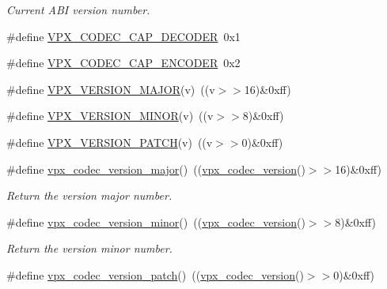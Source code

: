 \begin{DoxyCompactItemize}
\begin{DoxyCompactList}\small\item\em Current A\+BI version number. \end{DoxyCompactList}\item 
\#define \hyperlink{group__codec_gae10ad7f9548170aef77df09d48ad108a}{V\+P\+X\+\_\+\+C\+O\+D\+E\+C\+\_\+\+C\+A\+P\+\_\+\+D\+E\+C\+O\+D\+ER}~0x1
\item 
\#define \hyperlink{group__codec_gab2e8b76fff95ebd573a17bdc11f8a441}{V\+P\+X\+\_\+\+C\+O\+D\+E\+C\+\_\+\+C\+A\+P\+\_\+\+E\+N\+C\+O\+D\+ER}~0x2
\item 
\#define \hyperlink{group__codec_gadebddd67347fe47c0772b1e06b6173ba}{V\+P\+X\+\_\+\+V\+E\+R\+S\+I\+O\+N\+\_\+\+M\+A\+J\+OR}(v)~((v$>$$>$16)\&0xff)
\item 
\#define \hyperlink{group__codec_ga4a5ce4588576306dee0d95e8f8706f86}{V\+P\+X\+\_\+\+V\+E\+R\+S\+I\+O\+N\+\_\+\+M\+I\+N\+OR}(v)~((v$>$$>$8)\&0xff)
\item 
\#define \hyperlink{group__codec_ga4acf2cf4c35ff123d17cd67c069fdbaa}{V\+P\+X\+\_\+\+V\+E\+R\+S\+I\+O\+N\+\_\+\+P\+A\+T\+CH}(v)~((v$>$$>$0)\&0xff)
\item 
\#define \hyperlink{group__codec_gaf314b746e4e202045e85ac073c29a495}{vpx\+\_\+codec\+\_\+version\+\_\+major}()~((\hyperlink{group__codec_ga163037ae037ac760da65e4130c7d4767}{vpx\+\_\+codec\+\_\+version}()$>$$>$16)\&0xff)\hypertarget{group__codec_gaf314b746e4e202045e85ac073c29a495}{}\label{group__codec_gaf314b746e4e202045e85ac073c29a495}

\begin{DoxyCompactList}\small\item\em Return the version major number. \end{DoxyCompactList}\item 
\#define \hyperlink{group__codec_ga2b668688a7d1551ea89bcda8f2587f93}{vpx\+\_\+codec\+\_\+version\+\_\+minor}()~((\hyperlink{group__codec_ga163037ae037ac760da65e4130c7d4767}{vpx\+\_\+codec\+\_\+version}()$>$$>$8)\&0xff)\hypertarget{group__codec_ga2b668688a7d1551ea89bcda8f2587f93}{}\label{group__codec_ga2b668688a7d1551ea89bcda8f2587f93}

\begin{DoxyCompactList}\small\item\em Return the version minor number. \end{DoxyCompactList}\item 
\#define \hyperlink{group__codec_ga8ed64bded0d763fa2158312ac8fbcf26}{vpx\+\_\+codec\+\_\+version\+\_\+patch}()~((\hyperlink{group__codec_ga163037ae037ac760da65e4130c7d4767}{vpx\+\_\+codec\+\_\+version}()$>$$>$0)\&0xff)\hypertarget{group__codec_ga8ed64bded0d763fa2158312ac8fbcf26}{}\label{group__codec_ga8ed64bded0d763fa2158312ac8fbcf26}


\end{DoxyCompactItemize}
